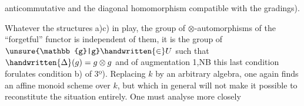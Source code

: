 anticommutative and the diagonal homomorphism  compatible with the gradings).

\handwritten{9\unsure{/|)}} Whatever the structures a)c) in play, the group of $\otimes$-automorphisms of the  ``forgetful'' functor is independent of them, it is the group of $\unsure{\mathbb{g}|g}\handwritten{\in}U$ such that $\handwritten{\Delta}(g)=g\otimes g$ and of augmentation 1,\unsure{(}NB this last condition forulates condition b) of 3º). Replacing $k$ by an arbitrary algebra, one again finds an  affine monoid scheme over $k$, but which in general will not make it possible to reconstitute the situation entirely.  One must analyse more closely
